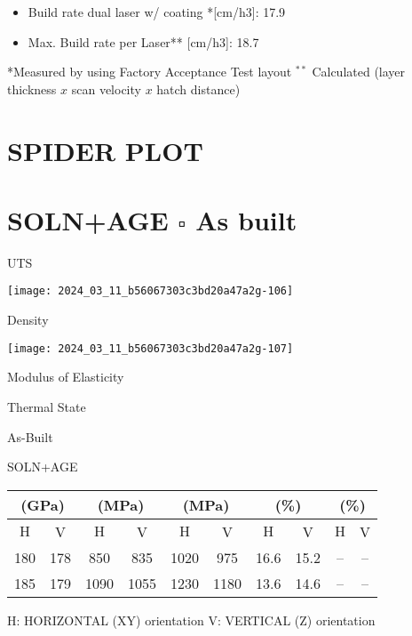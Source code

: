 \documentclass[10pt]{article}
\begin{document}
\begin{itemize}
  \item Build rate dual laser w/ coating *[cm/h3]: 17.9
  \item Max. Build rate per Laser** [cm/h3]: 18.7
\end{itemize}

*Measured by using Factory Acceptance Test layout ${ }^{* *}$ Calculated (layer thickness $x$ scan velocity $x$ hatch distance)

\section*{SPIDER PLOT}
\section*{SOLN+AGE $\square$ As built}
UTS

\begin{center}
\texttt{[image: 2024\_03\_11\_b56067303c3bd20a47a2g-106]}
\end{center}

Density

\begin{center}
\texttt{[image: 2024\_03\_11\_b56067303c3bd20a47a2g-107]}
\end{center}

Modulus of Elasticity

Thermal State

As-Built

SOLN+AGE

\begin{center}
\begin{tabular}{|c|c|c|c|c|c|c|c|c|c|}
\hline
\multicolumn{2}{|c|}{(GPa)} & \multicolumn{2}{|c|}{(MPa)} & \multicolumn{2}{|c|}{(MPa)} & \multicolumn{2}{|c|}{(\%)} & \multicolumn{2}{|c|}{(\%)} \\
\hline
$\mathrm{H}$ & V & $\mathrm{H}$ & V & $\mathrm{H}$ & V & $\mathrm{H}$ & V & $\mathrm{H}$ & V \\
\hline
180 & 178 & 850 & 835 & 1020 & 975 & 16.6 & 15.2 & -- & -- \\
\hline
185 & 179 & 1090 & 1055 & 1230 & 1180 & 13.6 & 14.6 & -- & -- \\
\hline
\end{tabular}
\end{center}

H: HORIZONTAL (XY) orientation V: VERTICAL (Z) orientation
\end{document}
